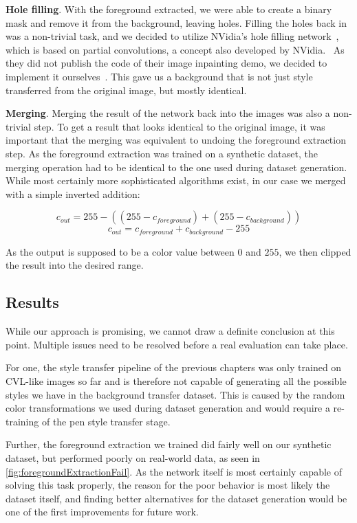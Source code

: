 \textbf{Hole filling}. With the foreground extracted, we were able to create a binary mask and remove it from the background, leaving holes. Filling the holes back in was a non-trivial task, and we decided to utilize NVidia's hole filling network~\cite{nvidiaInpaint}, which is based on partial convolutions, a concept also developed by NVidia.~\cite{nvidiaPconv} As they did not publish the code of their image inpainting demo, we decided to implement it ourselves~\cite{infillOurs}.
This gave us a background that is not just style transferred from the original image, but mostly identical.

\textbf{Merging}. Merging the result of the network back into the images was also a non-trivial step. To get a result that looks identical to the original image, it was important that the merging was equivalent to undoing the foreground extraction step. As the foreground extraction was trained on a synthetic dataset, the merging operation had to be identical to the one used during dataset generation. While most certainly more sophisticated algorithms exist, in our case we merged with a simple inverted addition:

\begin{equation}
c_{out} = 255 - ((255 - c_{foreground}) + (255 - c_{background}))
\end{equation}
\begin{equation}
c_{out} = c_{foreground} + c_{background} - 255
\end{equation}

As the output is supposed to be a color value between $0$ and $255$, we then clipped the result into the desired range.

\subsection{Results}

While our approach is promising, we cannot draw a definite conclusion at this point. Multiple issues need to be resolved before a real evaluation can take place.

For one, the style transfer pipeline of the previous chapters was only trained on CVL-like images so far and is therefore not capable of generating all the possible styles we have in the background transfer dataset. This is caused by the random color transformations we used during dataset generation and would require a re-training of the pen style transfer stage.


Further, the foreground extraction we trained did fairly well on our synthetic dataset, but performed poorly on real-world data, as seen in \cref{fig:foregroundExtractionFail}. As the network itself is most certainly capable of solving this task properly, the reason for the poor behavior is most likely the dataset itself, and finding better alternatives for the dataset generation would be one of the first improvements for future work.

